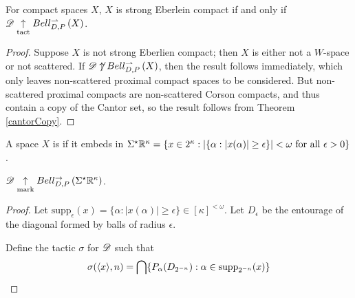 \documentclass[11pt]{article}
\begin{document}
  \begin{corollary}
    For compact spaces $X$,
    $X$ is strong Eberlein compact if and only if
    $\mathscr{D}\underset{\text{tact}}{\uparrow}Bell_{D,P}^{\rightharpoonup}\left({X}\right)$.
  \end{corollary}

  \begin{proof}
    Suppose $X$ is not strong Eberlien compact; then $X$ is either
    not a $W$-space or not scattered.
    If $\mathscr{D}\not\uparrow Bell_{D,P}^{\rightharpoonup}\left({X}\right)$, then the result follows immediately,
    which only leaves non-scattered proximal compact spaces to be considered.
    But non-scattered proximal compacts are non-scattered Corson compacts,
    and thus contain
    a copy of the Cantor set, so the result follows from Theorem
    \ref{cantorCopy}.
  \end{proof}

  \newpage

  \begin{definition}
    A space $X$ is  if it embeds in
    $
      \Sigma^\star\mathbb{R}^{\kappa}
        =
      \{
        x\in2^\kappa
      :
        |\{\alpha:|x(\alpha)|\geq \epsilon\}|<\omega
        \text{ for all } \epsilon > 0
      \}
    $.
  \end{definition}

  \begin{theorem}
    $\mathscr{D}\underset{\text{mark}}{\uparrow}Bell_{D,P}^{\to}\left({\Sigma^\star\mathbb{R}^{\kappa}}\right)$.
  \end{theorem}

  \begin{proof}
    Let
    $
      \text{supp}_\epsilon(x)
        =
      \{\alpha:|x(\alpha)|\geq \epsilon\}
        \in
      [\kappa]^{<\omega}
    $. Let $D_\epsilon$ be the entourage of the diagonal formed by
    balls of radius $\epsilon$.

    Define the tactic $\sigma$ for $\mathscr{D}$ such that
      \[
        \sigma(\langle x\rangle,n)
          =
        \bigcap\{
          P_\alpha(D_{2^{-n}}) : \alpha\in\text{supp}_{2^{-n}}(x)
        \}
      \]

  \end{proof}
\end{document}
